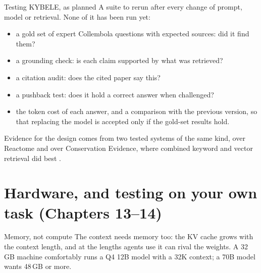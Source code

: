 \documentclass[11pt,aspectratio=169]{beamer}
\begin{document}
\begin{frame}{Testing KYBELE, as planned}
  A suite to rerun after every change of prompt, model or retrieval. None
  of it has been run yet:
  \begin{itemize}\small
    \item a gold set of expert Collembola questions with expected sources:
      did it find them?
    \item a grounding check: is each claim supported by what was retrieved?
    \item a citation audit: does the cited paper say this?
    \item a pushback test: does it hold a correct answer when challenged?
    \item the token cost of each answer, and a comparison with the previous
      version, so that replacing the model is accepted only if the gold-set
      results hold.
  \end{itemize}
  Evidence for the design comes from two tested systems of the same kind,
  over Reactome and over Conservation Evidence, where combined keyword and
  vector retrieval did best
  \parencite{mohammadi2025reacttome,iyer2025conservationevidence}.
\end{frame}

\section{Hardware, and testing on your own task (Chapters 13--14)}

\begin{frame}{Memory, not compute}
  \begingroup{}\endgroup
  The context needs memory too: the KV cache grows with the context
  length, and at the lengths agents use it can rival the weights. A
  32\,GB machine comfortably runs a Q4 12B model with a 32K context; a 70B
  model wants 48\,GB or more.
\end{frame}
\end{document}
